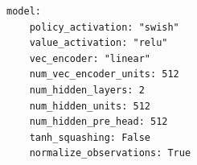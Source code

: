 \begin{listing}
		
		
		
		
	\begin{verbatim}
model:
    policy_activation: "swish"
    value_activation: "relu"
    vec_encoder: "linear"
    num_vec_encoder_units: 512
    num_hidden_layers: 2
    num_hidden_units: 512
    num_hidden_pre_head: 512
    tanh_squashing: False
    normalize_observations: True


\end{verbatim}
\end{listing}
